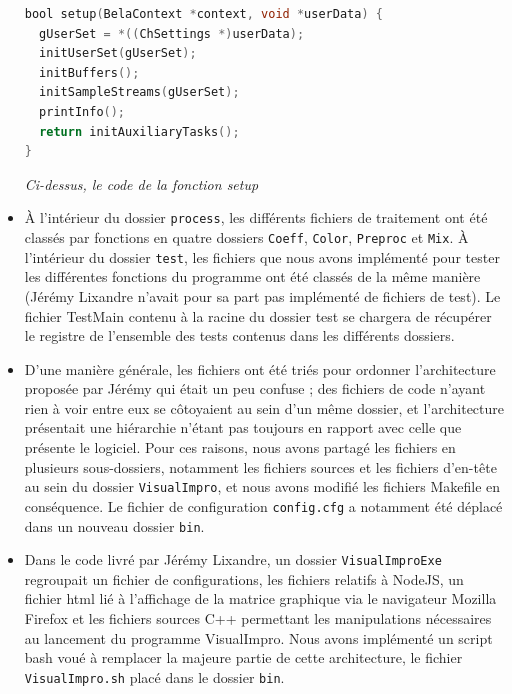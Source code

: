\begin{itemize}
       \begin{lstlisting}[language=C, frame=single, breaklines=true]
bool setup(BelaContext *context, void *userData) {
  gUserSet = *((ChSettings *)userData);
  initUserSet(gUserSet);
  initBuffers();
  initSampleStreams(gUserSet);
  printInfo();
  return initAuxiliaryTasks();
}
 \end{lstlisting}

 \begin{center}
  \textit{Ci-dessus, le code de la fonction setup}
 \end{center}

 \item \`{A} l'intérieur du dossier \verb!process!, les
       différents fichiers de traitement ont été classés par
       fonctions en quatre dossiers \verb!Coeff!, \verb!Color!,
       \verb!Preproc! et \verb!Mix!. \`{A} l'intérieur du dossier
       \verb!test!, les fichiers que nous avons implémenté pour tester les
       différentes fonctions du programme ont été classés de la même
       manière (Jérémy Lixandre n'avait pour sa part pas implémenté
       de fichiers de test). Le fichier TestMain contenu à la racine du
       dossier test se chargera de récupérer le registre de l'ensemble
       des tests contenus dans les différents dossiers.

 \item D'une manière générale, les fichiers ont été triés pour
       ordonner l'architecture proposée par Jérémy qui était un peu
       confuse ; des fichiers de code n'ayant rien à voir entre eux
       se côtoyaient au sein d'un même dossier, et l'architecture
       présentait une hiérarchie n'étant pas toujours en rapport
       avec celle que présente le logiciel. Pour ces raisons, nous
       avons partagé les fichiers en plusieurs sous-dossiers,
       notamment les fichiers sources et les fichiers d'en-tête au
       sein du dossier \verb!VisualImpro!, et nous avons modifié
       les fichiers Makefile en conséquence. Le fichier de
       configuration \verb!config.cfg! a notamment été déplacé dans
       un nouveau dossier \verb!bin!.

 \item Dans le code livré par Jérémy Lixandre, un dossier
       \verb!VisualImproExe! regroupait un fichier de
       configurations, les fichiers relatifs à NodeJS, un fichier
       html lié à l'affichage de la matrice graphique via le
       navigateur Mozilla Firefox et les fichiers sources C++
       permettant les manipulations nécessaires au lancement du
       programme VisualImpro. Nous avons implémenté un script
       bash voué à remplacer la majeure partie de cette
       architecture, le fichier \verb!VisualImpro.sh! placé dans
       le dossier \verb!bin!.
\end{itemize}
